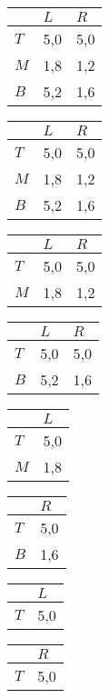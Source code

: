 \documentclass[10pt,a4paper]{article}
\begin{document}
\begin{table}[h]
\centering
\begin{tabular}[l]{|l|l|l|}
\hline
          & $L$ & $R$  \\ \hline
$T$     & 5,0   & 5,0 \\ \hline
$M$     & 1,8 & 1,2  \\ \hline
$B$		& 5,2	& 1,6 \\ \hline
\end{tabular}
\quad
\begin{tabular}[r]{|l|l|l|}
\hline
          & $L$ & $R$  \\ \hline
$T$     & 5,0   & 5,0 \\ \hline
$M$     & 1,8 & 1,2  \\ \hline
$B$		& 5,2	& 1,6 \\ \hline
\end{tabular}

\begin{tabular}[l]{|l|l|l|}
\hline
          & $L$ & $R$  \\ \hline
$T$     & 5,0   & 5,0 \\ \hline
$M$     & 1,8 & 1,2  \\ \hline
\end{tabular}
\quad
\begin{tabular}[r]{|l|l|l|}
\hline
          & $L$ & $R$  \\ \hline
$T$     & 5,0   & 5,0 \\ \hline
$B$     & 5,2 & 1,6  \\ \hline
\end{tabular}

\begin{tabular}[l]{|l|l|}
\hline
          & $L$\\ \hline
$T$     & 5,0 \\ \hline
$M$     & 1,8\\ \hline
\end{tabular}
\quad
\begin{tabular}[r]{|l|l|}
\hline
          & $R$\\ \hline
$T$     & 5,0 \\ \hline
$B$     & 1,6\\ \hline
\end{tabular}

\begin{tabular}[l]{|l|l|}
\hline
          & $L$\\ \hline
$T$     & 5,0 \\ \hline
\end{tabular}
\quad
\begin{tabular}[r]{|l|l|}
\hline
          & $R$\\ \hline
$T$     & 5,0 \\ \hline
\end{tabular}
\end{table}
 
\end{document}
